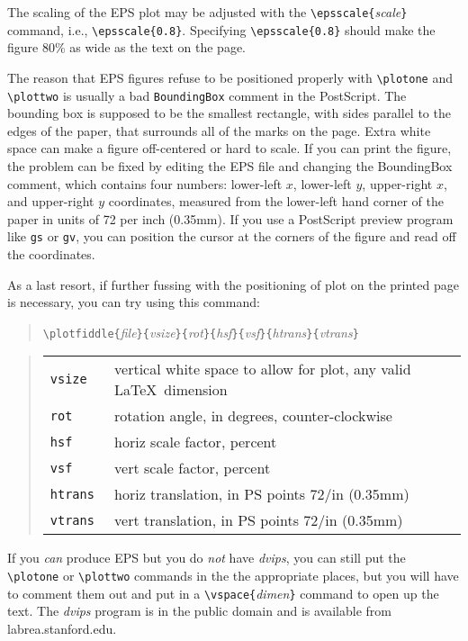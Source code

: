 \documentclass[11pt,twoside]{article}
\def\arg#1{{\it#1\/}}
\let\prog=\arg
\begin{document}
The scaling of the EPS plot may be adjusted with the 
\verb+\epsscale{+\arg{scale}\verb+}+ command, i.e., \verb+\epsscale{0.8}+.
Specifying \verb+\epsscale{0.8}+ should make the figure 80\% as wide as
the text on the page.

The reason that EPS figures refuse to be positioned properly with
\verb+\plotone+ and \verb+\plottwo+ is usually a bad {\tt BoundingBox}
comment in the PostScript.  The bounding box is supposed to be the
smallest rectangle, with sides parallel to the edges of the paper, that
surrounds all of the marks on the page.  Extra white space can make a
figure off-centered or hard to scale.  If you can print the figure, the
problem can be fixed by editing the EPS file and changing the BoundingBox
comment, which contains four numbers:  lower-left $x$, lower-left $y$,
upper-right $x$, and upper-right $y$ coordinates, measured from the
lower-left hand corner of the paper in units of 72 per inch (0.35mm).  
If you use
a PostScript preview program like {\tt gs} or {\tt gv}, you can position
the cursor at the corners of the figure and read off the coordinates.

As a last resort, if further fussing with the positioning of plot on
the printed page is necessary, you can try using this command:

\begin{quote} \verb+\plotfiddle{+\arg{file}\verb+}{+\arg{vsize}\verb+}{+\arg{rot}\verb+}{+\arg{hsf}\verb+}{+\arg{vsf}\verb+}{+\arg{htrans}\verb+}{+\arg{vtrans}\verb+}+ \end{quote}

\begin{quote} 
\begin{tabular}{lp{3in}} 
\tt vsize & 
 vertical white space to allow for plot, any valid \LaTeX\ dimension\\ 
\tt rot & rotation angle, in degrees, counter-clockwise\\ 
\tt hsf & horiz scale factor, percent\\
\tt vsf & vert scale factor, percent\\ 
\tt htrans & horiz translation, in PS points 72/in (0.35mm)\\ 
\tt vtrans & vert translation, in PS points 72/in (0.35mm)\\
\end{tabular} 
\end{quote}

If you {\em can} produce EPS but you do {\em not} have \prog{dvips},
you can still put the \verb+\plotone+ or \verb+\plottwo+ commands in the
the appropriate places, but you will have to comment them out and put
in a \verb+\vspace{+\arg{dimen}\verb+}+ command  to open up the text.
The \prog{dvips} program is in the public domain and is available from
labrea.stanford.edu.
\end{document}
